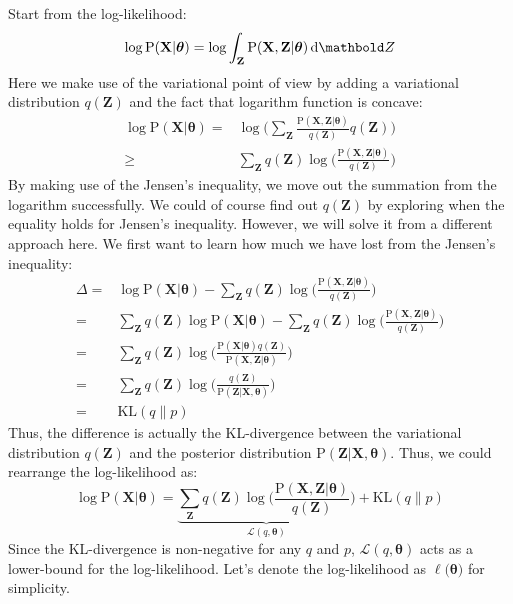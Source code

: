 Start from the log-likelihood:
\[
\log\mathrm{P}(\mathbf{X}|\boldsymbol{\theta}) = \log\int_{\mathbf{Z}} \mathrm{P}(\mathbf{X, Z}|\boldsymbol{\theta}) \dif{\mbZ}
\]
Here we make use of the variational point of view by adding a variational distribution $q(\mathbf{Z})$ and the fact that logarithm function is concave:
\begin{align*}
\log\mathrm{P}(\mathbf{X}|\boldsymbol{\theta}) =& \log\Big(\sum_{\mathbf{Z}} \frac{\mathrm{P}(\mathbf{X, Z}|\boldsymbol{\theta})}{q(\mathbf{Z})} q(\mathbf{Z})\Big) \\
\geq& \sum_{\mathbf{Z}}q(\mathbf{Z}) \log\Big(\frac{\mathrm{P}(\mathbf{X, Z}|\boldsymbol{\theta})}{q(\mathbf{Z})}\Big)
\end{align*}
By making use of the Jensen's inequality, we move out the summation from the logarithm successfully. We could of course find out $q(\mathbf{Z})$ by exploring when the equality holds for Jensen's inequality. However, we will solve it from a different approach here. We first want to learn how much we have lost from the Jensen's inequality:
\begin{align*}
\Delta =& \log\mathrm{P}(\mathbf{X}|\boldsymbol{\theta}) - \sum_{\mathbf{Z}}q(\mathbf{Z}) \log\Big(\frac{\mathrm{P}(\mathbf{X, Z}|\boldsymbol{\theta})}{q(\mathbf{Z})}\Big) \\
=& \sum_{\mathbf{Z}}q(\mathbf{Z})\log\mathrm{P}(\mathbf{X}|\boldsymbol{\theta}) - \sum_{\mathbf{Z}}q(\mathbf{Z}) \log\Big(\frac{\mathrm{P}(\mathbf{X, Z}|\boldsymbol{\theta})}{q(\mathbf{Z})}\Big)\\
=& \sum_{\mathbf{Z}}q(\mathbf{Z})\log\Big(\frac{\mathrm{P}(\mathbf{X}|\boldsymbol{\theta}) q(\mathbf{Z}) }{\mathrm{P}(\mathbf{X, Z}|\boldsymbol{\theta})} \Big)\\
=& \sum_{\mathbf{Z}}q(\mathbf{Z})\log\Big(\frac{q(\mathbf{Z})}{\mathrm{P}(\mathbf{Z}|\mathbf{X}, \boldsymbol{\theta})} \Big)\\
=& \text{KL}(q\|p)
\end{align*}
Thus, the difference is actually the KL-divergence between the variational distribution $q(\mathbf{Z})$ and the posterior distribution $\mathrm{P}(\mathbf{Z}|\mathbf{X}, \boldsymbol{\theta})$. Thus, we could rearrange the log-likelihood as:
\[
\log\mathrm{P}(\mathbf{X} | \boldsymbol{\theta}) = \underbrace{\sum_{\mathbf{Z}}q(\mathbf{Z}) \log\Big(\frac{\mathrm{P}(\mathbf{X, Z}|\boldsymbol{\theta})}{q(\mathbf{Z})}\Big)}_{\mathcal{L}(q, \boldsymbol{\theta})} + \text{KL}(q\|p)
\]
Since the KL-divergence is non-negative for any $q$ and $p$, $\mathcal{L}(q, \boldsymbol{\theta})$ acts as a lower-bound for the log-likelihood. Let's denote the log-likelihood as $\ell(\boldsymbol{\theta)}$ for simplicity. 

